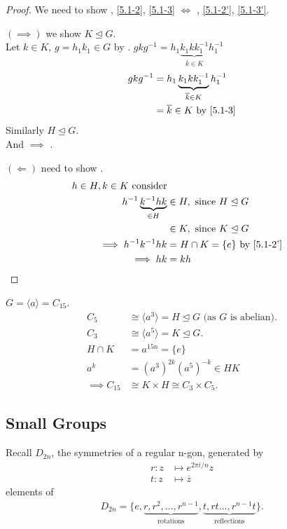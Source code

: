 \begin{proof}
  We need to show , \ref{5.1-2}, \ref{5.1-3} $\iff$ , \ref{5.1-2'}, \ref{5.1-3'}.

  $(\implies)$ we show $K \trianglelefteq G$.\\
  Let $k \in K$, $g = h_1 k_1 \in G$ by .
  $g k g^{-1} = h_1 \underbrace{k_1 k k_1^{-1}}_{\overline{k} \in K} h_1^{-1}$
  \begin{align*}
    g k g^{-1} &= h_1 \underbrace{k_1 k k_1^{-1}}_{\overline{k} \in K} h_1^{-1} \\
    &= \overline{k} \in K \text{ by } \Cref{5.1-3}
  \end{align*} 
  Similarly $H \trianglelefteq G$. \\
  And  $\implies$ .

  $(\Longleftarrow)$ need to show .
  \begin{align*}
    h \in H, k \in K \text{ consider} \\
    h^{-1} \underbrace{k^{-1} h k}_{\in H} &\in H, \text{ since } H \trianglelefteq G \\
    &\in K, \text{ since } K \trianglelefteq G \\
    \implies h^{-1}k^{-1} h k &= H \cap K = \{ e \} \text{ by \Cref{5.1-2'}} \\
    \implies hk &= kh 
  \end{align*} 
\end{proof} 

\begin{example}
  $G = \langle a \rangle = C_{15}$.
  \begin{align*}
    C_5 &\cong \langle a^3 \rangle = H \trianglelefteq G \text{ (as $G$ is abelian)}. \\
    C_3 &\cong \langle a^5 \rangle = K \trianglelefteq G. \\
    H \cap K &= a^{15n} = \{ e \} \\
    a^k &= (a^3)^{2k} (a^5)^{-k} \in HK \\
    \implies C_{15} &\cong K \times H \cong C_3 \times C_5.
  \end{align*} 
\end{example} 

\subsection{Small Groups}

Recall $D_{2n}$, the symmetries of a regular n-gon, generated by 
\begin{align*}
  r : z &\mapsto e^{2 \pi i / n} z \\
  t : z &\mapsto \overline{z} 
\end{align*} 
elements of \begin{align*}
  D_{2n} = \{e, \underbrace{r, r^2, \ldots, r^{n-1}}_\text{rotations}, \underbrace{t, rt \ldots, r^{n-1}t}_\text{reflections} \}.
\end{align*}

